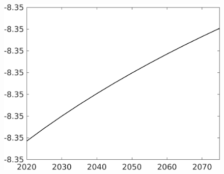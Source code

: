 \documentclass[12pt]{article}
\begin{document}
\begin{figure}[h!!]
\begin{minipage}[]{0.32\textwidth}
	\end{minipage}	
	\begin{minipage}[]{0.32\textwidth}
		\includegraphics[width=1\textwidth]{../../codding_model/own_basedOnFried/optimalPol_010922_revision/figures/all_13Sept22/CompTaul_LFBAUPer_Reg0_Ln_spillover0_nsk0_xgr0_knspil0_sep1_countec0_GovRev0_etaa0.79.png}
	\end{minipage}	
\end{figure}
\end{document}
